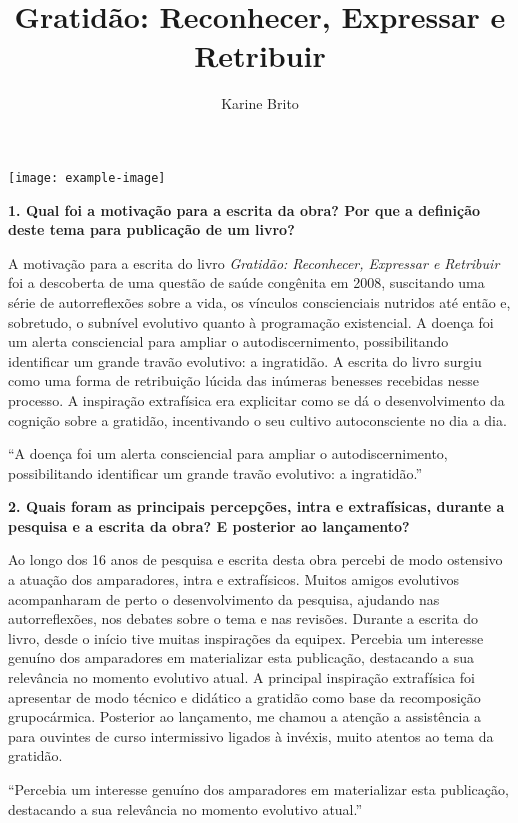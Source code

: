 \documentclass{gescons}
\author{Karine Brito}
\title{Gratidão: Reconhecer, Expressar e Retribuir}
\begin{document}
    \makeentrevistatitle

    \begin{multicols}{2}


\noindent\texttt{[image: example-image]} 

\textbf{1. Qual foi a motivação para a escrita da obra? Por que a definição deste tema para publicação de um livro?}

A motivação para a escrita do livro \textit{Gratidão: Reconhecer, Expressar e Retribuir} foi a descoberta de uma questão de saúde congênita em 2008, suscitando uma série de autorreflexões sobre a vida, os vínculos conscienciais nutridos até então e, sobretudo, o subnível evolutivo quanto à programação existencial.  A doença foi um alerta consciencial para ampliar o autodiscernimento, possibilitando identificar um grande travão evolutivo: a ingratidão. A escrita do livro surgiu como uma forma de retribuição lúcida das inúmeras benesses recebidas nesse processo. A inspiração extrafísica era explicitar como se dá o desenvolvimento da cognição sobre a gratidão, incentivando o seu cultivo autoconsciente no dia a dia. 

\begin{pullquote}
``A doença foi um alerta consciencial para ampliar o autodiscernimento, possibilitando identificar um grande travão evolutivo: a ingratidão.''
\end{pullquote}

\textbf{2. Quais foram as principais percepções, intra e extrafísicas, durante a pesquisa e a escrita da obra? E posterior ao lançamento?}

Ao longo dos 16 anos de pesquisa e escrita desta obra percebi de modo ostensivo a atuação dos amparadores, intra e extrafísicos. Muitos amigos evolutivos acompanharam de perto o desenvolvimento da pesquisa, ajudando nas autorreflexões, nos debates sobre o tema e nas revisões. Durante a escrita do livro, desde o início tive muitas inspirações da equipex. Percebia um interesse genuíno dos amparadores em materializar esta publicação, destacando a sua relevância no momento evolutivo atual. A principal inspiração extrafísica foi apresentar de modo técnico e didático a gratidão como base da recomposição grupocármica. Posterior ao lançamento, me chamou a atenção a assistência a para ouvintes de curso intermissivo ligados à invéxis, muito atentos ao tema da gratidão.

\begin{pullquote}
``Percebia um interesse genuíno dos amparadores em materializar esta publicação, destacando a sua relevância no momento evolutivo atual.''
\end{pullquote}


\end{multicols}
\end{document}
